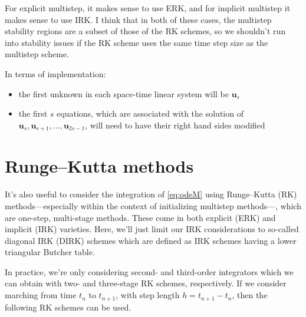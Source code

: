 \documentclass[a4paper,12pt]{article}
\begin{document}
For explicit multistep, it makes sense to use ERK, and for implicit multistep it makes sense to use IRK. I think that in both of these cases, the multistep stability regions are a subset of those of the RK schemes, so we shouldn't run into stability issues if the RK scheme uses the same time step size as the multistep scheme. 

In terms of implementation: 
\begin{itemize}
\item the first unknown in each space-time linear system will be $\mathbf{u}_s$
\item the first $s$ equations, which are associated with the solution of $\mathbf{u}_s, \mathbf{u}_{s+1}, \dots, \mathbf{u}_{2s-1}$, will need to have their right hand sides modified
\end{itemize}

\section{Runge--Kutta methods}\label{sec:rk_sequential}

It's also useful to consider the integration of \eqref{eq:odeM} using Runge--Kutta (RK) methods---especially within the context of initializing multistep methods---, which are one-step, multi-stage methods. These come in both explicit (ERK) and implicit (IRK) varieties. Here, we'll just limit our IRK considerations to so-called diagonal IRK (DIRK) schemes which are defined as IRK schemes having a lower triangular Butcher table. 

In practice, we're only considering second- and third-order integrators which we can obtain with two- and three-stage RK schemes, respectively. If we consider marching from time $t_n$ to $t_{n+1}$, with step length $h = t_{n+1} - t_n$, then the following RK schemes can be used.
\end{document}

